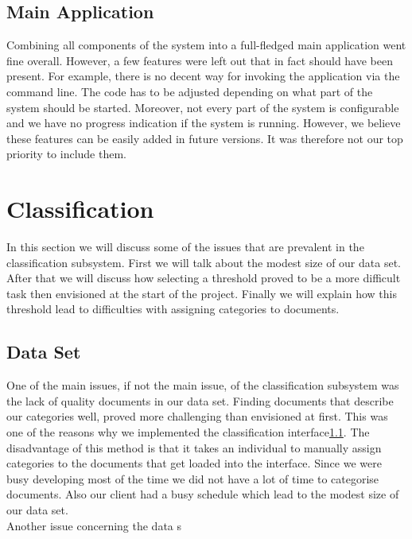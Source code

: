 \subsection{Main Application}
Combining all components of the system into a full-fledged main application went fine overall. However, a few features were left out that in fact should have been present. For example, there is no decent way for invoking the application via the command line. The code has to be adjusted depending on what part of the system should be started. Moreover, not every part of the system is configurable and we have no progress indication if the system is running. However, we believe these features can be easily added in future versions. It was therefore not our top priority to include them.



\section{Classification} \label{sec:discuss-classifier}
In this section we will discuss some of the issues that are prevalent in the classification subsystem. First we will talk about the modest size of our data set. After that we will discuss how selecting a threshold proved to be a more difficult task then envisioned at the start of the project. Finally we will explain how this threshold lead to difficulties with assigning categories to documents.\\

\subsection{Data Set}
One of the main issues, if not the main issue, of the classification subsystem was the lack of quality documents in our data set. Finding documents that describe our categories well, proved more challenging than envisioned at first. This was one of the reasons why we implemented the classification interface\ref{}. The disadvantage of this method is that it takes an individual to manually assign categories to the documents that get loaded into the interface. Since we were busy developing most of the time we did not have a lot of time to categorise documents. Also our client had a busy schedule which lead to the modest size of our data set.\\
Another issue concerning the data s

